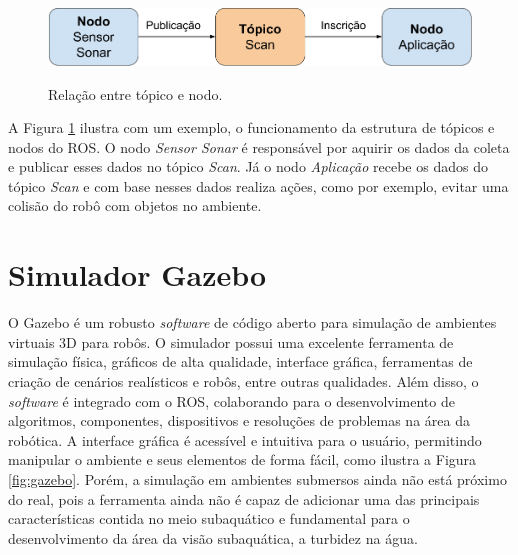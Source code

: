 \hspace{1em}

\begin{figure}[H]
    \centering
    \caption{Relação entre tópico e nodo.}
    \includegraphics[scale=0.3]{dados/figuras/topic_node.png}
    \label{fig:topic_node}
\end{figure}

A Figura \ref{fig:topic_node} ilustra com um exemplo, o funcionamento da estrutura de tópicos e nodos do ROS. O nodo \textit{Sensor Sonar} é responsável por aquirir os dados da coleta e publicar esses dados no tópico \textit{Scan}. Já o nodo \textit{Aplicação} recebe os dados do tópico \textit{Scan} e com base nesses dados realiza ações, como por exemplo, evitar uma colisão do robô com objetos no ambiente.

\section{Simulador Gazebo}
\label{sec:gazebo}

O Gazebo é um robusto \textit{software} de código aberto para simulação de ambientes virtuais 3D para robôs. O simulador possui uma excelente ferramenta de simulação física, gráficos de alta qualidade, interface gráfica, ferramentas de criação de cenários realísticos e robôs, entre outras qualidades. Além disso, o \textit{software} é integrado com o ROS, colaborando para o desenvolvimento de algoritmos, componentes, dispositivos e resoluções de problemas na área da robótica. A interface gráfica é acessível e intuitiva para o usuário, permitindo manipular o ambiente e seus elementos de forma fácil, como ilustra a Figura \ref{fig:gazebo}. Porém, a simulação em ambientes submersos ainda não está próximo do real, pois a ferramenta ainda não é capaz de adicionar uma das principais características contida no meio subaquático e fundamental para o desenvolvimento da área da visão subaquática, a turbidez na água. 

